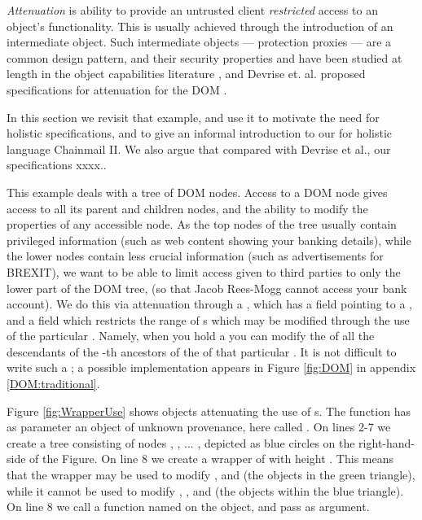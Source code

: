 \emph{Attenuation} is ability to provide an untrusted client \emph{restricted}  access to an object's functionality. This is usually achieved through the introduction of an intermediate object. Such intermediate objects --- protection proxies \cite{gof} --- are a common design pattern, and their security properties and have been studied at length in the object capabilities literature \cite{millerPhD,murray10-infoflow}, and 
Devrise et. al. proposed specifications for attenuation for the DOM \cite{dd}.

In this section we revisit that example, and use it to motivate the
need for holistic specifications, and to give an informal introduction
to our for holistic  language Chainmail II. We also argue that
compared with Devrise et al., our specifications xxxx..

This example deals with a tree of DOM nodes. Access to a DOM node
gives access to all its parent and children nodes, and the ability to
modify the properties of any accessible node. As the top nodes of the
tree usually contain privileged information (such as web content
showing your banking details), while the lower nodes contain less
crucial information (such as advertisements for BREXIT), we want to be
able to limit access given to third parties to only the lower part of
the DOM tree, (so that Jacob Rees-Mogg cannot access your bank
account). We do this via attenuation through a , which has
a field  pointing to a , and a field 
which restricts the range of s which may be modified through
the use of the particular . Namely, when you hold
a  you can modify the  of all the
descendants of the -th ancestors of the  of that
particular .  It is not difficult to write such
a ; a possible implementation appears in
Figure \ref{fig:DOM} in appendix \ref{DOM:traditional}.


Figure \ref{fig:WrapperUse} shows  
 objects    attenuating the use of 
s.
The
function  has as parameter an object of unknown
provenance, here called . On lines 2-7 we create a tree
consisting of nodes , , ... , depicted as blue
circles on the right-hand-side of the Figure. On line 8 we create a
wrapper of  with height . This means that the
wrapper  may be used to modify ,  and 
(\ie the objects in the green triangle), while it cannot be used to
modify , , and  (\ie the objects within the
blue triangle).  On line 8 we call a function named  on
the  object, and pass  as argument.

